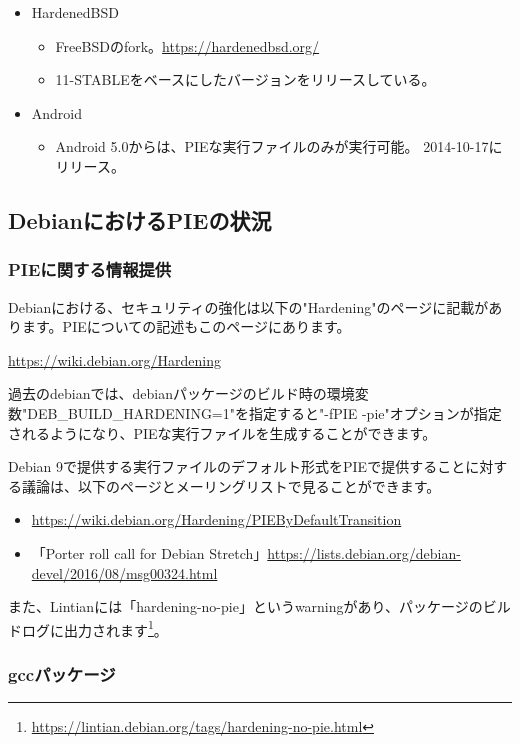 \documentclass[mingoth,a4paper]{jsarticle}
\begin{document}
\begin{itemize}
\begin{itemize}
  \end{itemize}
\item HardenedBSD
  \begin{itemize}
  \item FreeBSDのfork。\url{https://hardenedbsd.org/}
  \item 11-STABLEをベースにしたバージョンをリリースしている。
  \end{itemize}
\item Android
  \begin{itemize}
  \item Android 5.0からは、PIEな実行ファイルのみが実行可能。 2014-10-17にリリース。
  \end{itemize}
\end{itemize}


\subsection{DebianにおけるPIEの状況}

\subsubsection{PIEに関する情報提供}

Debianにおける、セキュリティの強化は以下の"Hardening"のページに記載があります。PIEについての記述もこのページにあります。


\url{https://wiki.debian.org/Hardening}


過去のdebianでは、debianパッケージのビルド時の環境変数"DEB\_BUILD\_HARDENING=1"を指定すると"-fPIE -pie"オプションが指定されるようになり、PIEな実行ファイルを生成することができます。


Debian 9で提供する実行ファイルのデフォルト形式をPIEで提供することに対する議論は、以下のページとメーリングリストで見ることができます。

\begin{itemize}
  \item \url{https://wiki.debian.org/Hardening/PIEByDefaultTransition}
  \item 「Porter roll call for Debian Stretch」\url{https://lists.debian.org/debian-devel/2016/08/msg00324.html}
\end{itemize}


また、Lintianには「hardening-no-pie」というwarningがあり、パッケージのビルドログに出力されます\footnote{\url{https://lintian.debian.org/tags/hardening-no-pie.html}}。


\subsubsection{gccパッケージ}
\end{document}
